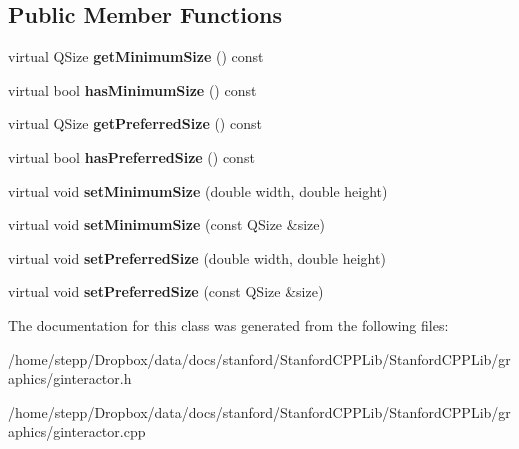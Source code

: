 \subsection*{Public Member Functions}
\begin{DoxyCompactItemize}
\item 
\mbox{\label{class__Internal__QWidget_a2c0c9dad7d7500d1e32e76fc7a8a9a6b}} 
virtual Q\+Size {\bfseries get\+Minimum\+Size} () const
\item 
\mbox{\label{class__Internal__QWidget_a9337446d73de94299c94d242bb06ef36}} 
virtual bool {\bfseries has\+Minimum\+Size} () const
\item 
\mbox{\label{class__Internal__QWidget_a36d68f0abf7f5f4cf08fe4f7a27f82ab}} 
virtual Q\+Size {\bfseries get\+Preferred\+Size} () const
\item 
\mbox{\label{class__Internal__QWidget_a9ec292930d71768f329129b3be0d9374}} 
virtual bool {\bfseries has\+Preferred\+Size} () const
\item 
\mbox{\label{class__Internal__QWidget_a39e413b3be85bb5c77891059d01d9bb6}} 
virtual void {\bfseries set\+Minimum\+Size} (double width, double height)
\item 
\mbox{\label{class__Internal__QWidget_abbe14f5b582873c73046307773c7602b}} 
virtual void {\bfseries set\+Minimum\+Size} (const Q\+Size \&size)
\item 
\mbox{\label{class__Internal__QWidget_a5a84a2e6b356528a7c5bf9dd80392d7e}} 
virtual void {\bfseries set\+Preferred\+Size} (double width, double height)
\item 
\mbox{\label{class__Internal__QWidget_adf1b182baf1ca9eadcfd7c253cf86e04}} 
virtual void {\bfseries set\+Preferred\+Size} (const Q\+Size \&size)
\end{DoxyCompactItemize}


The documentation for this class was generated from the following files\+:\begin{DoxyCompactItemize}
\item 
/home/stepp/\+Dropbox/data/docs/stanford/\+Stanford\+C\+P\+P\+Lib/\+Stanford\+C\+P\+P\+Lib/graphics/ginteractor.\+h\item 
/home/stepp/\+Dropbox/data/docs/stanford/\+Stanford\+C\+P\+P\+Lib/\+Stanford\+C\+P\+P\+Lib/graphics/ginteractor.\+cpp\end{DoxyCompactItemize}
